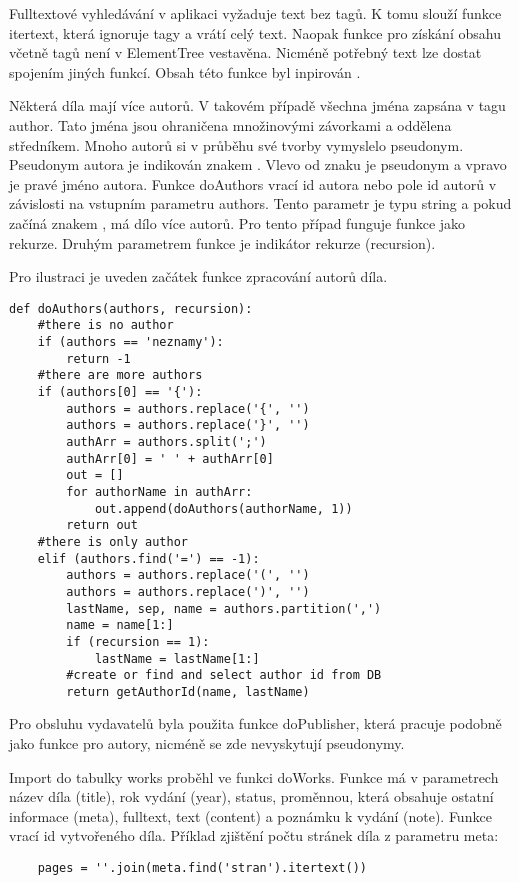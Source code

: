             Fulltextové vyhledávání v aplikaci vyžaduje text bez tagů. K tomu slouží funkce itertext, která ignoruje tagy a vrátí celý text. Naopak funkce pro získání obsahu včetně tagů není v ElementTree vestavěna. Nicméně potřebný text lze dostat spojením jiných funkcí. Obsah této funkce byl inpirován \cite{fn01}. 
            
            Některá díla mají více autorů. V takovém případě všechna jména zapsána v tagu author. Tato jména jsou ohraničena množinovými závorkami a oddělena středníkem. Mnoho autorů si v průběhu své tvorby vymyslelo pseudonym. Pseudonym autora je indikován znakem \uv{=}. Vlevo od znaku je pseudonym a vpravo je pravé jméno autora. Funkce doAuthors vrací id autora nebo pole id autorů v závislosti na vstupním parametru authors. Tento parametr je typu string a pokud začíná znakem \uv{\{}, má dílo více autorů. Pro tento případ funguje funkce jako rekurze. Druhým parametrem funkce je indikátor rekurze (recursion).
            
            Pro ilustraci je uveden začátek funkce zpracování autorů díla.
             \begin{lstlisting}
def doAuthors(authors, recursion):
    #there is no author
    if (authors == 'neznamy'):
        return -1
    #there are more authors
    if (authors[0] == '{'):
        authors = authors.replace('{', '')
        authors = authors.replace('}', '')
        authArr = authors.split(';')
        authArr[0] = ' ' + authArr[0]
        out = []
        for authorName in authArr:
            out.append(doAuthors(authorName, 1))
        return out
    #there is only author 
    elif (authors.find('=') == -1):
        authors = authors.replace('(', '')
        authors = authors.replace(')', '')
        lastName, sep, name = authors.partition(',')
        name = name[1:]
        if (recursion == 1):
            lastName = lastName[1:]
        #create or find and select author id from DB    
        return getAuthorId(name, lastName)
             \end{lstlisting}
            
            Pro obsluhu vydavatelů byla použita funkce doPublisher, která pracuje podobně jako funkce pro autory, nicméně se zde nevyskytují pseudonymy. 
            
            Import do tabulky works proběhl ve funkci doWorks. Funkce má v parametrech název díla (title), rok vydání (year), status, proměnnou, která obsahuje ostatní informace (meta), fulltext, text (content) a poznámku k vydání (note). Funkce vrací id vytvořeného díla. Příklad zjištění počtu stránek díla z parametru meta:
            \begin{lstlisting}
    pages = ''.join(meta.find('stran').itertext())
            \end{lstlisting}
            
